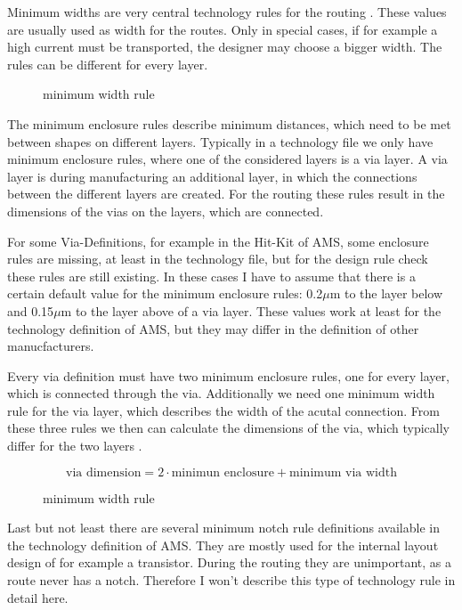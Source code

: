 Minimum widths are very central technology rules for the routing . These values are usually used as width for the routes. Only in special cases, if for example a high current must be transported, the designer may choose a bigger width. The rules can be different for every layer.

\begin{figure}
	\centering
	
	\caption{minimum width rule}
	\label{fig:technology_rule_width}
\end{figure}

The minimum enclosure rules describe minimum distances, which need to be met between shapes on different layers. Typically in a technology file we only have minimum enclosure rules, where one of the considered layers is a via layer. A via layer is during manufacturing an additional layer, in which the connections between the different layers are created. For the routing these rules result in the dimensions of the vias on the layers, which are connected.

For some Via-Definitions, for example in the Hit-Kit of AMS, some enclosure rules are missing, at least in the technology file, but for the design rule check these rules are still existing. In these cases I have to assume that there is a certain default value for the minimum enclosure rules: 0.2$\mu$m to the layer below and 0.15$\mu$m to the layer above of a via layer. These values work at least for the technology definition of AMS, but they may differ in the definition of other manucfacturers.

Every via definition must have two minimum enclosure rules, one for every layer, which is connected through the via. Additionally we need one minimum width rule for the via layer, which describes the width of the acutal connection. From these three rules we then can calculate the dimensions of the via, which typically differ for the two layers .

\[\text{via dimension} = 2 \cdot \text{minimun enclosure} + \text{minimum via width}\]

\begin{figure}
	\centering
	
	\caption{minimum width rule}
	\label{fig:technology_rule_via_dimensions}
\end{figure}

Last but not least there are several minimum notch rule definitions available in the technology definition of AMS. They are mostly used for the internal layout design of for example a transistor. During the routing they are unimportant, as a route never has a notch. Therefore I won't describe this type of technology rule in detail here. 